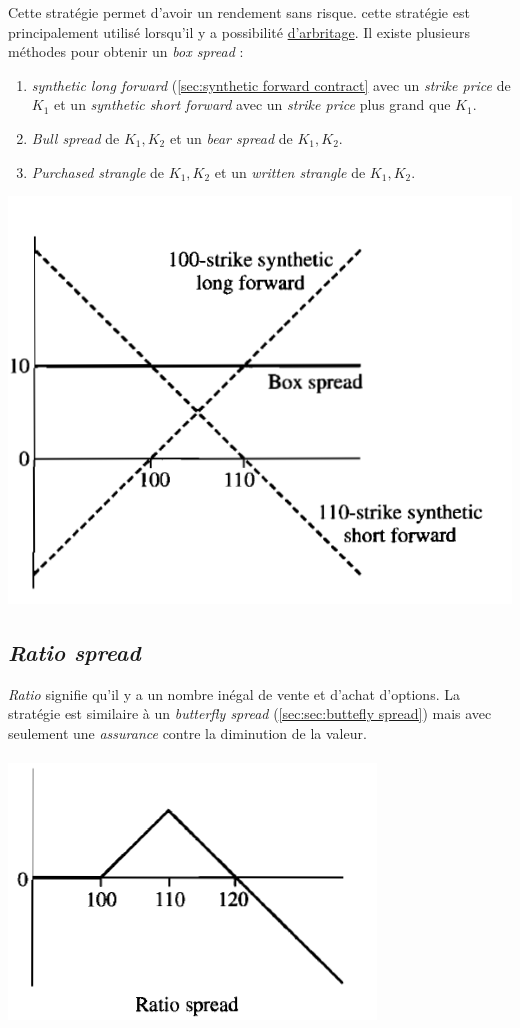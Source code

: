 \documentclass[11pt,french]{report}
\begin{document}
Cette stratégie permet d'avoir un rendement sans risque. cette stratégie est principalement utilisé lorsqu'il y a possibilité \href{http://www.investopedia.com/terms/a/arbitrage.asp?o=40186&l=dir&qsrc=999&qo=investopediaSiteSearch}{d'arbritage}. Il existe plusieurs méthodes pour obtenir un \emph{box spread} : 
\begin{enumerate}
\item \emph{synthetic long forward} (\ref{sec:synthetic forward contract} avec un \emph{strike price} de $K_1$ et un \emph{synthetic short forward} avec un \emph{strike price} plus grand que $K_1$.
\item \emph{Bull spread} de $K_1, K_2$ et un \emph{bear spread} de $K_1, K_2$.
\item \emph{Purchased strangle} de $K_1, K_2$ et un \emph{written strangle} de $K_1, K_2$.
\end{enumerate}
\includegraphics[scale=0.45]{picture34}

\subsection{\emph{Ratio spread}}
\label{sec:sec:ratio spread}

\emph{Ratio} signifie qu'il y a un nombre inégal de vente et d'achat d'options. La stratégie est similaire à un \emph{butterfly spread} (\ref{sec:sec:buttefly spread}) mais avec seulement une \textit{assurance} contre la diminution de la valeur.
\\
\\ \includegraphics[scale=0.45]{picture35.PNG}
\end{document}
